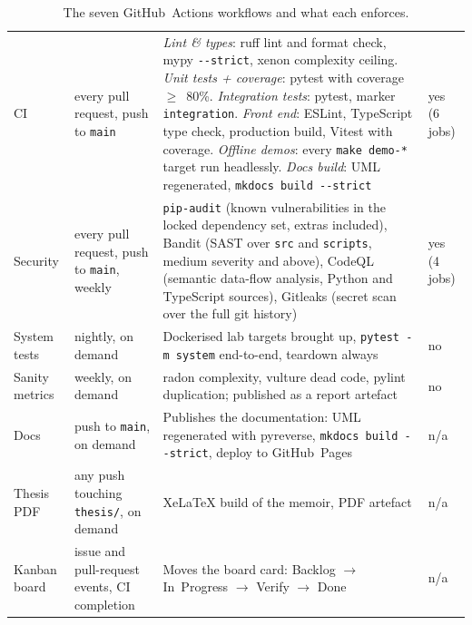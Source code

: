 \begin{table}[!htbp]
\caption[The seven continuous-integration workflows]{The seven GitHub~Actions workflows
and what each enforces.}
\label{tab:workflows}
\footnotesize
\renewcommand{\arraystretch}{1.3}
\begin{center}
\begin{tabular}{|L{2.2cm}|L{2.6cm}|L{6.6cm}|L{1.3cm}|}
\hline
{}
 &  &  &  \\ \hline
CI & every pull request, push to \texttt{main} & \emph{Lint \& types}: ruff lint and format check, mypy \texttt{-{}-strict}, xenon complexity ceiling. \emph{Unit tests + coverage}: pytest with coverage $\geq$~80\%. \emph{Integration tests}: pytest, marker \texttt{integration}. \emph{Front end}: ESLint, TypeScript type check, production build, Vitest with coverage. \emph{Offline demos}: every \texttt{make demo-*} target run headlessly. \emph{Docs build}: UML regenerated, \texttt{mkdocs build -{}-strict} & yes (6 jobs) \\ \hline
Security & every pull request, push to \texttt{main}, weekly & \texttt{pip-audit} (known vulnerabilities in the locked dependency set, extras included), Bandit (SAST over \texttt{src} and \texttt{scripts}, medium severity and above), CodeQL (semantic data-flow analysis, Python and TypeScript sources), Gitleaks (secret scan over the full git history) & yes (4 jobs) \\ \hline
System tests & nightly, on demand & Dockerised lab targets brought up, \texttt{pytest -m system} end-to-end, teardown always & no \\ \hline
Sanity metrics & weekly, on demand & radon complexity, vulture dead code, pylint duplication; published as a report artefact & no \\ \hline
Docs & push to \texttt{main}, on demand & Publishes the documentation: UML regenerated with pyreverse, \texttt{mkdocs build -{}-strict}, deploy to GitHub~Pages & n/a \\ \hline
Thesis PDF & any push touching \texttt{thesis/}, on demand & XeLaTeX build of the memoir, PDF artefact & n/a \\ \hline
Kanban board & issue and pull-request events, CI completion & Moves the board card: Backlog $\rightarrow$ In~Progress $\rightarrow$ Verify $\rightarrow$ Done & n/a \\ \hline
\end{tabular}
\end{center}
\end{table}


